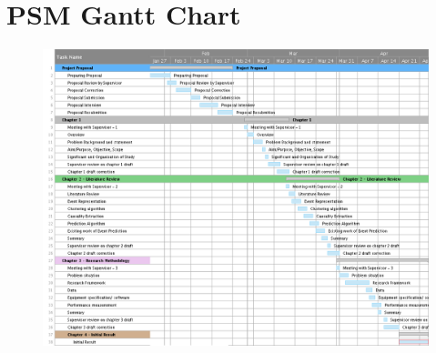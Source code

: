 \documentclass[twoside]{utmthesis}
\begin{document}
\chapter{PSM Gantt Chart}
\begin{figure}[H]
	\centering
	\includegraphics[angle=90,width=1.0\linewidth]{"diagram/Thesis Gantt Chart NEW"}
	\label{fig:thesis-gantt-chart-new}
\end{figure}


\endmatter
\end{document}
